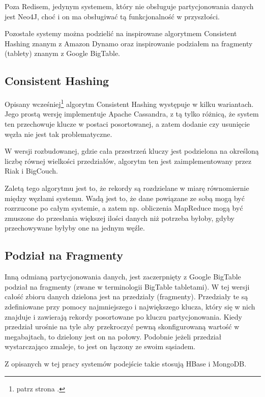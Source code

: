Poza Redisem, jedynym systemem, który nie obsługuje partycjonowania danych jest Neo4J, choć i on ma obsługiwać tą funkcjonalność w przyszłości.

Pozostałe systemy można podzielić na inspirowane algorytmem Consistent Hashing znanym z Amazon Dynamo oraz inspirowanie podziałem na fragmenty (tablety) znanym z Google BigTable.

\subsection*{Consistent Hashing}

Opisany wcześniej\footnote{patrz strona \pageref{sec:dynamo-consistent-hashing}.} algorytm Consistent Hashing występuje w kilku wariantach.
Jego prostą wersję implementuje Apache Cassandra, z tą tylko różnicą, że system ten przechowuje klucze w postaci posortowanej, a zatem dodanie czy usunięcie węzła nie jest tak problematyczne.

W wersji rozbudowanej, gdzie cała przestrzeń kluczy jest podzielona na określoną liczbę równej wielkości przedziałów, algorytm ten jest zaimplementowany przez Riak i BigCouch.

Zaletą tego algorytmu jest to, że rekordy są rozdzielane w miarę równomiernie między węzłami systemu.
Wadą jest to, że dane powiązane ze sobą mogą być rozrzucone po całym systemie, a zatem np. obliczenia MapReduce mogą być zmuszone do przesłania większej ilości danych niż potrzeba byłoby, gdyby przechowywane byłyby one na jednym węźle.

\subsection*{Podział na Fragmenty}

Inną odmianą partycjonowania danych, jest zaczerpnięty z Google BigTable podział na fragmenty (zwane w terminologii BigTable tabletami).
W tej wersji całość zbioru danych dzielona jest na przedziały (fragmenty).
Przedziały te są zdefiniowane przy pomocy najmniejszego i największego klucza, który się w nich znajduje i zawierają rekordy posortowane po kluczu partycjonowania.
Kiedy przedział urośnie na tyle aby przekroczyć pewną skonfigurowaną wartość w megabajtach, to dzielony jest on na połowy.
Podobnie jeżeli przedział wystarczająco zmaleje, to jest on łączony ze swoim sąsiadem.

Z opisanych w tej pracy systemów podejście takie stosują HBase i MongoDB.

